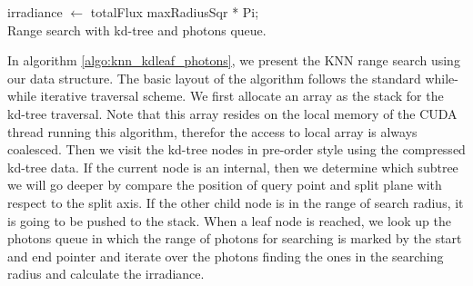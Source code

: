 \begin{algorithm}
	\Return irradiance \(\leftarrow\) totalFlux \/ maxRadiusSqr * Pi; \\ 
	
	\caption{Range search with kd-tree and photons queue.} 	
	\label{algo:knn_kdleaf_photons} 
\end{algorithm}

In algorithm \ref{algo:knn_kdleaf_photons}, we present the KNN range search using our data structure. The basic layout of the algorithm follows the standard while-while iterative traversal scheme.  We first allocate an array as the stack for the kd-tree traversal. Note that this array resides on the local memory of the CUDA thread running this algorithm, therefor the access to local array is always coalesced. Then we visit the kd-tree nodes in pre-order style using the compressed kd-tree data. If the current node is an internal, then we determine which subtree we will go deeper by compare the position of query point and split plane with respect to the split axis. If the other child node is in the range of search radius, it is going to be pushed to the stack. When a leaf node is reached, we look up the photons queue in which the range of photons for searching is marked by the start and end pointer and iterate over the photons finding the ones in the searching radius and calculate the irradiance. 

